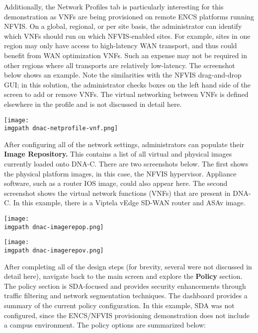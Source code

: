 Additionally, the Network Profiles tab is particularly interesting for this
demonstration as VNFs are being provisioned on remote ENCS platforms running
NFVIS. On a global, regional, or per site basis, the administrator can
identify which VNFs should run on which NFVIS-enabled sites. For example,
sites in one region may only have access to high-latency WAN transport, and
thus could benefit from WAN optimization VNFs. Such an expense may not be
required in other regions where all transports are relatively low-latency. The
screenshot below shows an example. Note the similarities with the NFVIS
drag-and-drop GUI; in this solution, the administrator checks boxes on the
left hand side of the screen to add or remove VNFs. The virtual networking
between VNFs is defined elsewhere in the profile and is not discussed in
detail here.

    \begin{minipage}[t]{\linewidth}
	  \centering
      \texttt{[image: \\imgpath dnac-netprofile-vnf.png]}
    \end{minipage}

After configuring all of the network settings, administrators can populate
their \textbf{Image Repository.} This contains a list of all virtual and physical
images currently loaded onto DNA-C. There are two screenshots below. The first
shows the physical platform images, in this case, the NFVIS hypervisor.
Appliance software, such as a router IOS image, could also appear here. The
second screenshot shows the virtual network functions (VNFs) that are present
in DNA-C. In this example, there is a Viptela vEdge SD-WAN router and ASAv image.

    \begin{minipage}[t]{\linewidth}
	  \centering
      \texttt{[image: \\imgpath dnac-imagerepop.png]}
    \end{minipage}

    \begin{minipage}[t]{\linewidth}
	  \centering
      \texttt{[image: \\imgpath dnac-imagerepov.png]}
    \end{minipage}

After completing all of the design steps (for brevity, several were not
discussed in detail here), navigate back to the main screen and explore the
\textbf{Policy} section. The policy section is SDA-focused and provides
security enhancements through traffic filtering and network segmentation
techniques. The dashboard provides a summary of the current policy
configuration. In this example, SDA was not configured, since the ENCS/NFVIS
provisioning demonstration does not include a campus environment. The policy
options are summarized below:

